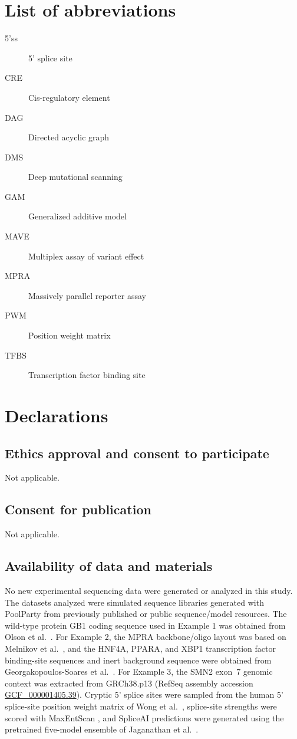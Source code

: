 \documentclass[pdflatex,sn-vancouver-num,referee,oneside]{sn-jnl}
\begin{document}
\section*{List of abbreviations}
\begin{description}
  \item[5'ss] 5' splice site
  \item[CRE] Cis-regulatory element
  \item[DAG] Directed acyclic graph
  \item[DMS] Deep mutational scanning
  \item[GAM] Generalized additive model
  \item[MAVE] Multiplex assay of variant effect
  \item[MPRA] Massively parallel reporter assay
  \item[PWM] Position weight matrix
  \item[TFBS] Transcription factor binding site
\end{description}

\section*{Declarations}

\subsection*{Ethics approval and consent to participate}
Not applicable.

\subsection*{Consent for publication}
Not applicable.

\subsection*{Availability of data and materials}
No new experimental sequencing data were generated or analyzed in this study. The datasets analyzed were simulated sequence libraries generated with PoolParty from previously published or public sequence/model resources. The wild-type protein GB1 coding sequence used in Example 1 was obtained from Olson et al.~\citep{Olson2014iq}. For Example 2, the MPRA backbone/oligo layout was based on Melnikov et al.~\citep{Melnikov2012dw}, and the HNF4A, PPARA, and XBP1 transcription factor binding-site sequences and inert background sequence were obtained from Georgakopoulos-Soares et al.~\citep{GeorgakopoulosSoares2023tf}. For Example 3, the SMN2 exon~7 genomic context was extracted from GRCh38.p13 (RefSeq assembly accession \href{https://www.ncbi.nlm.nih.gov/datasets/genome/GCF_000001405.39/}{GCF\_000001405.39}). Cryptic 5' splice sites were sampled from the human 5' splice-site position weight matrix of Wong et al.~\citep{Wong2018quantitative}, splice-site strengths were scored with MaxEntScan \citep{Yeo2004me}, and SpliceAI predictions were generated using the pretrained five-model ensemble of Jaganathan et al.~\citep{Jaganathan2019ps}.
\end{document}
